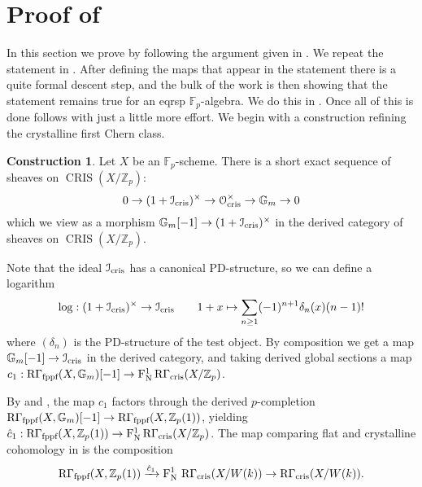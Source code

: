 \documentclass[11pt]{article}
\theoremstyle{plain}
\theoremstyle{definition}
\newtheorem{cons}[ThmS]{Construction}
\theoremstyle{remark}
\numberwithin{equation}{section}
\renewcommand{\sec}[2]{\section{#2}\label{S:#1}}
\newcommand{\ssec}[2]{\subsection{#2}\label{SubS:#1}}
\newcommand\calO{\mathcal{O}}
\newcommand\calI{\mathcal{I}}
\newcommand{\Gm}{\mathbb{G}_m}
\newcommand{\Fp}{\mathbb{F}_p}
\newcommand{\Zp}{\mathbb{Z}_p}
\newcommand\xto[2]{\xrightarrow[#1]{#2}}
\newcommand{\W}{W}                                                       %
\DeclareMathOperator{\Rflat}{R\Gamma_{\textnormal{fppf}}}                %
\DeclareMathOperator{\Cris}{CRIS}                                        %
\DeclareMathOperator{\Rcris}{R\Gamma_{cris}}                             %
\newcommand\ocris{\calO_{\textnormal{cris}}}                             %
\newcommand\icris{\calI_{\textnormal{cris}}}                             %
\DeclareMathOperator{\Nyg}{F_N^1}                                      %
\begin{document}
\sec{pruffa}{Proof of }




In this section we prove  by following the argument given in \cite[Section 7]{bhattlurie}. We repeat the statement in . After defining the maps that appear in the statement there is a quite formal descent step, and the bulk of the work is then showing that the statement remains true for an eqrsp $\Fp$-algebra. We do this in . Once all of this is done  follows with just a little more effort. We begin with a construction refining the crystalline first Chern class.


\begin{cons}
    
Let $X$ be an $\Fp$-scheme. There is a short exact sequence of sheaves on $\Cris(X/\Zp)$:
$$0\to(1+\icris)^{\times}\to\ocris^{\times}\to\Gm\to0$$ 
which we view as a morphism $\Gm[-1]\to(1+\icris)^{\times}$ in the derived category of sheaves on $\Cris(X/\Zp)$. 

Note that the ideal $\icris$ has a canonical PD-structure, so we can define a logarithm 
\[
\log:(1+\icris)^{\times}\to\icris \quad\quad 1+x\mapsto\sum_{n\ge1}(-1)^{n+1}\delta_n(x)(n-1)!
\]
where $(\delta_n)$ is the PD-structure of the test object. By composition we get a map $\Gm[-1]\to\icris$ in the derived category, and taking derived global sections a map $c_1:\Rflat(X,\Gm)[-1]\to\Nyg\Rcris(X/\Zp)$.



\end{cons}


By  and , the map $c_1$ factors through the derived $p$-completion $\Rflat(X,\Gm)[-1]\to\Rflat(X,\Zp(1))$, yielding $\hat{c}_1:\Rflat(X,\Zp(1))\to\Nyg\Rcris(X/\Zp)$. The map comparing flat and crystalline cohomology in  is the composition 
\begin{equation}\label{comparisonmap}
\Rflat(X,\Zp(1))\xto{}{\hat{c}_1}\Nyg{}\Rcris(X/\W(k))\to\Rcris(X/\W(k)).
\end{equation}
\end{document}
